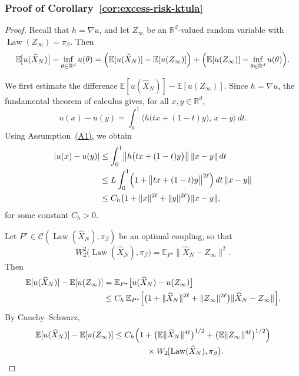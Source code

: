 \documentclass[11pt,a4paper,reqno]{amsart}
\theoremstyle{plain}
\theoremstyle{definition}
\theoremstyle{remark}
\newcommand{\R}{\mathbb{R}}
\newcommand{\E}{\mathbb{E}}
\DeclareMathOperator{\Law}{Law}
\begin{document}
\subsubsection{Proof of Corollary~\ref{cor:excess-risk-ktula}}
\label{proof:expected-risk-ktula}
\begin{proof}
Recall that \(h=\nabla u\), and let \(Z_\infty\) be an \(\R^d\)-valued random variable with
\(\Law(Z_\infty)=\pi_\beta\). Then
\begin{equation}\label{eq:excess-splitting-correct}
  \E\!\bigl[u(\widehat X_N)\bigr]-\inf_{\theta\in\R^d}u(\theta)
  =
  \Bigl(\E[u(\widehat X_N)]-\E[u(Z_\infty)]\Bigr)
  +
  \Bigl(\E[u(Z_\infty)]-\inf_{\theta\in\R^d}u(\theta)\Bigr).
\end{equation}

We first estimate the difference \(\E[u(\widehat X_N)]-\E[u(Z_\infty)]\). Since \(h=\nabla u\), the
fundamental theorem of calculus gives, for all \(x,y\in\R^d\),
\[
  u(x)-u(y)
  =
  \int_0^1 \langle h\bigl(tx+(1-t)y\bigr),\,x-y\rangle\,dt.
\]
Using Assumption~\hyperref[ass:PJG]{\textup{(A1)}}, we obtain
\begin{align*}
  |u(x)-u(y)|
  &\le
  \int_0^1 \bigl\|h\bigl(tx+(1-t)y\bigr)\bigr\|\,\|x-y\|\,dt \\
  &\le
  L\int_0^1 \Bigl(1+\bigl\|tx+(1-t)y\bigr\|^{2\ell}\Bigr)\,dt\,\|x-y\| \\
  &\le
  C_h\bigl(1+\|x\|^{2\ell}+\|y\|^{2\ell}\bigr)\|x-y\|,
\end{align*}
for some constant \(C_h>0\).

Let \(P^\star\in\mathcal C(\Law(\widehat X_N),\pi_\beta)\) be an optimal coupling, so that
\[
  W_2^2\!\bigl(\Law(\widehat X_N),\pi_\beta\bigr)
  =
  \E_{P^\star}\|\widehat X_N-Z_\infty\|^2.
\]
Then
\begin{align*}
  \E[u(\widehat X_N)]-\E[u(Z_\infty)]
  &=
  \E_{P^\star}\bigl[u(\widehat X_N)-u(Z_\infty)\bigr] \\
  &\le
  C_h\,\E_{P^\star}\Bigl[
    \bigl(1+\|\widehat X_N\|^{2\ell}+\|Z_\infty\|^{2\ell}\bigr)
    \|\widehat X_N-Z_\infty\|
  \Bigr].
\end{align*}
By Cauchy--Schwarz,
\begin{equation}\label{eq:excess-risk-w2-step}
\begin{aligned}
  \E[u(\widehat X_N)]-\E[u(Z_\infty)]
  &\le
  C_h
  \Bigl(
    1+\bigl(\E\|\widehat X_N\|^{4\ell}\bigr)^{1/2}
    +\bigl(\E\|Z_\infty\|^{4\ell}\bigr)^{1/2}
  \Bigr) \\
  &\qquad\qquad\times
  W_2\!\bigl(\Law(\widehat X_N),\pi_\beta\bigr).
\end{aligned}
\end{equation}


\end{proof}
\end{document}
